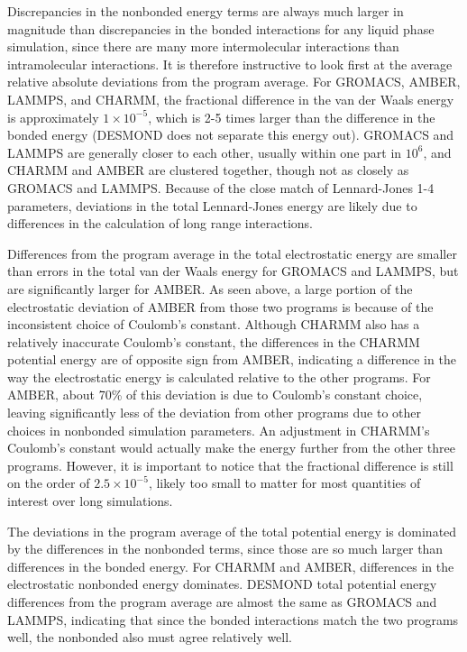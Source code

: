 Discrepancies in the nonbonded energy terms are always much larger in
magnitude than discrepancies in the bonded interactions for any liquid
phase simulation, since there are many more intermolecular
interactions than intramolecular interactions.  It is therefore
instructive to look first at the average relative absolute deviations
from the program average. For GROMACS, AMBER, LAMMPS, and CHARMM, the
fractional difference in the van der Waals energy is approximately
$1\times 10^{-5}$, which is 2-5 times larger than the difference in
the bonded energy (DESMOND does not separate this energy out). GROMACS
and LAMMPS are generally closer to each other, usually within one part
in $10^6$, and CHARMM and AMBER are clustered together, though not as
closely as GROMACS and LAMMPS. Because of the close match of
Lennard-Jones 1-4 parameters, deviations in the total Lennard-Jones
energy are likely due to differences in the calculation of long range
interactions.

Differences from the program average in the total electrostatic energy
are smaller than errors in the total van der Waals energy for GROMACS
and LAMMPS, but are significantly larger for AMBER.  As seen above, a
large portion of the electrostatic deviation of AMBER from those two
programs is because of the inconsistent choice of Coulomb's constant.
Although CHARMM also has a relatively inaccurate Coulomb's constant,
the differences in the CHARMM potential energy are of opposite sign from AMBER, indicating a difference in the way the
electrostatic energy is calculated relative to the other programs.  
For AMBER, about 70\% of this deviation is due to 
Coulomb's constant choice, leaving significantly less of the deviation
from other programs due to other choices in nonbonded simulation
parameters. An adjustment in CHARMM's Coulomb's constant would
actually make the energy further from the other three programs.
However, it is important to notice that the fractional difference is
still on the order of $2.5 \times 10^{-5}$, likely too small to matter
for most quantities of interest over long simulations.

The deviations in the program average of the total potential energy is
dominated by the differences in the nonbonded terms, since those are
so much larger than differences in the bonded energy.  For CHARMM and
AMBER, differences in the electrostatic nonbonded energy
dominates. DESMOND total potential energy differences from the
program average are almost the same as GROMACS and LAMMPS, indicating
that since the bonded interactions match the two programs well, the
nonbonded also must agree relatively well.

